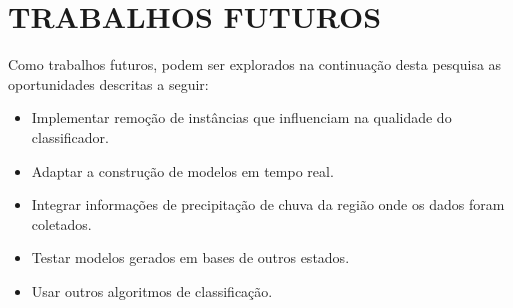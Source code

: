 \documentclass[
	12pt,				%
	openright,			%
	oneside,	
	a4paper,				%
	english,				%
	brazil				%
]{abntex2/abntex2} %
\begin{document}
	\section{TRABALHOS FUTUROS}
	\vspace{1\baselineskip}
	Como trabalhos futuros, podem ser explorados na continuação desta pesquisa as oportunidades descritas a seguir:
	
	\begin{itemize}
		\item Implementar remoção de instâncias que influenciam na qualidade do classificador.
		\item Adaptar a construção de modelos em tempo real.
		\item Integrar informações de precipitação de chuva da região onde os dados foram coletados.
		\item Testar modelos gerados em bases de outros estados.
		\item Usar outros algoritmos de classificação.
	\end{itemize}

\postextual
{}
%









\begin{anexosenv}



%

\end{anexosenv}
\end{document}
